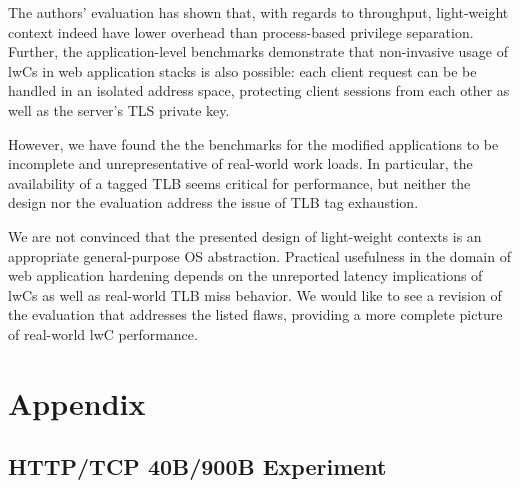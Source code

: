 \documentclass[10pt,twocolumn,a4paper]{article}
\begin{document}
The authors' evaluation has shown that, with regards to throughput, light-weight context indeed have lower overhead than process-based privilege separation.
Further, the application-level benchmarks demonstrate that non-invasive usage of lwCs in web application stacks is also possible:
each client request can be be handled in an isolated address space, protecting client sessions from each other as well as the server's TLS private key.

However, we have found the the benchmarks for the modified applications to be incomplete and unrepresentative of real-world work loads.
In particular, the availability of a tagged TLB seems critical for performance, but neither the design nor the evaluation address the issue of TLB tag exhaustion.

We are not convinced that the presented design of light-weight contexts is an appropriate general-purpose OS abstraction.
Practical usefulness in the domain of web application hardening depends on the unreported latency implications of lwCs as well as real-world TLB miss behavior.
We would like to see a revision of the evaluation that addresses the listed flaws, providing a more complete picture of real-world lwC performance.

\onecolumn
\section{Appendix}

\subsection{HTTP/TCP 40B/900B Experiment}\label{appendix:httppayloads}



\twocolumn
\nocite{*}
\clearpage
\printbibliography
\end{document}
